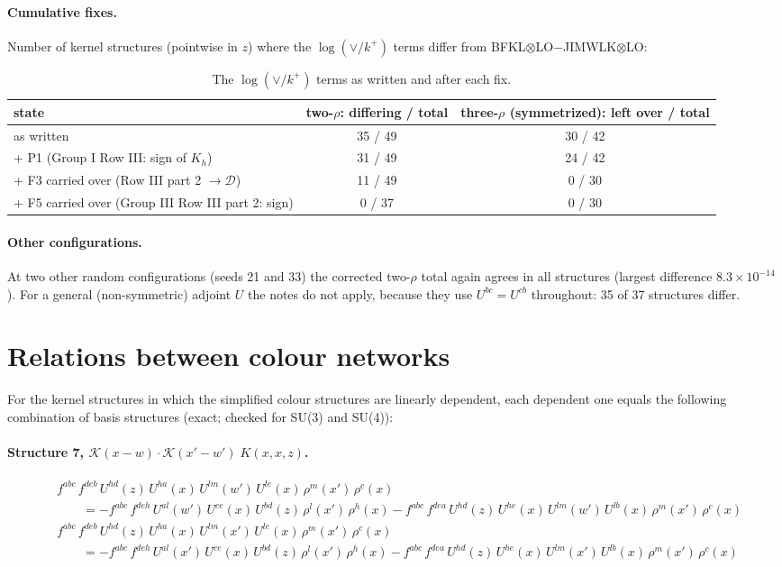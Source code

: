 \documentclass[10pt]{article}
\numberwithin{equation}{section}
\newcommand{\KK}{\mathcal K}
\begin{document}
\paragraph{Cumulative fixes.} Number of kernel structures (pointwise in $z$) where the $\log(\vee/k^+)$ terms differ from BFKL$\otimes$LO$-$JIMWLK$\otimes$LO:
\begin{table}[H]
\centering\small
\begin{tabular}{@{}l c c@{}}
state & two-$\rho$: differing / total & three-$\rho$ (symmetrized): left over / total\\ \hline
as written & 35 / 49 & 30 / 42\\
+ P1 (Group I Row III: sign of $K_h$) & 31 / 49 & 24 / 42\\
+ F3 carried over (Row III part 2 $\to\mathcal D$) & 11 / 49 & 0 / 30\\
+ F5 carried over (Group III Row III part 2: sign) & 0 / 37 & 0 / 30\\
\end{tabular}
\caption{The $\log(\vee/k^+)$ terms as written and after each fix.}\label{tab:states}
\end{table}

\paragraph{Other configurations.} At two other random configurations (seeds 21 and 33) the corrected two-$\rho$ total again agrees in all structures (largest difference $8.3\times10^{-14}$). For a general (non-symmetric) adjoint $U$ the notes do not apply, because they use $U^{bc}=U^{cb}$ throughout: 35 of 37 structures differ.

\appendix
\section{Relations between colour networks}\label{app:rel}
For the kernel structures in which the simplified colour structures are linearly dependent, each dependent one equals the following combination of basis structures (exact; checked for SU(3) and SU(4)):

\paragraph{Structure 7, $\KK(x-w)\cdot\KK(x'-w')\;K(x,x,z)$.}
\begin{align*}
&f^{abc}\,f^{deb}\,U^{hd}(z)\,U^{ha}(x)\,U^{lm}(w')\,U^{le}(x)\,\rho^{m}(x')\,\rho^{c}(x)\\&\qquad=-f^{abc}\,f^{deh}\,U^{al}(w')\,U^{ce}(x)\,U^{bd}(z)\,\rho^{l}(x')\,\rho^{h}(x)-f^{abc}\,f^{dea}\,U^{hd}(z)\,U^{he}(x)\,U^{lm}(w')\,U^{lb}(x)\,\rho^{m}(x')\,\rho^{c}(x)\\&f^{abc}\,f^{deb}\,U^{hd}(z)\,U^{ha}(x)\,U^{lm}(x')\,U^{le}(x)\,\rho^{m}(x')\,\rho^{c}(x)\\&\qquad=-f^{abc}\,f^{deh}\,U^{al}(x')\,U^{ce}(x)\,U^{bd}(z)\,\rho^{l}(x')\,\rho^{h}(x)-f^{abc}\,f^{dea}\,U^{hd}(z)\,U^{he}(x)\,U^{lm}(x')\,U^{lb}(x)\,\rho^{m}(x')\,\rho^{c}(x)
\end{align*}
\end{document}
